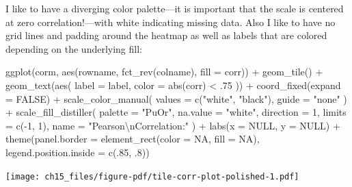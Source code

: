 \documentclass[
  letterpaper,
  DIV=11,
  numbers=noendperiod]{scrreprt}
\newenvironment{Shaded}{\begin{snugshade}}{\end{snugshade}}
\newcommand{\AttributeTok}[1]{\textcolor[rgb]{0.40,0.45,0.13}{#1}}
\newcommand{\ConstantTok}[1]{\textcolor[rgb]{0.56,0.35,0.01}{#1}}
\newcommand{\DecValTok}[1]{\textcolor[rgb]{0.68,0.00,0.00}{#1}}
\newcommand{\FunctionTok}[1]{\textcolor[rgb]{0.28,0.35,0.67}{#1}}
\newcommand{\NormalTok}[1]{\textcolor[rgb]{0.00,0.23,0.31}{#1}}
\newcommand{\SpecialCharTok}[1]{\textcolor[rgb]{0.37,0.37,0.37}{#1}}
\newcommand{\StringTok}[1]{\textcolor[rgb]{0.13,0.47,0.30}{#1}}
\begin{document}
I like to have a diverging color palette---it is important that the
scale is centered at zero correlation!---with white indicating missing
data. Also I like to have no grid lines and padding around the heatmap
as well as labels that are colored depending on the underlying fill:

\begin{Shaded}
\begin{Highlighting}[]
\FunctionTok{ggplot}\NormalTok{(corm, }\FunctionTok{aes}\NormalTok{(rowname, }\FunctionTok{fct\_rev}\NormalTok{(colname),}
                 \AttributeTok{fill =}\NormalTok{ corr)) }\SpecialCharTok{+}
  \FunctionTok{geom\_tile}\NormalTok{() }\SpecialCharTok{+}
  \FunctionTok{geom\_text}\NormalTok{(}\FunctionTok{aes}\NormalTok{(}
    \AttributeTok{label =}\NormalTok{ label,}
    \AttributeTok{color =} \FunctionTok{abs}\NormalTok{(corr) }\SpecialCharTok{\textless{}}\NormalTok{ .}\DecValTok{75}
\NormalTok{  )) }\SpecialCharTok{+}
  \FunctionTok{coord\_fixed}\NormalTok{(}\AttributeTok{expand =} \ConstantTok{FALSE}\NormalTok{) }\SpecialCharTok{+}
  \FunctionTok{scale\_color\_manual}\NormalTok{(}
    \AttributeTok{values =} \FunctionTok{c}\NormalTok{(}\StringTok{"white"}\NormalTok{, }\StringTok{"black"}\NormalTok{),}
    \AttributeTok{guide =} \StringTok{"none"}
\NormalTok{  ) }\SpecialCharTok{+}
  \FunctionTok{scale\_fill\_distiller}\NormalTok{(}
    \AttributeTok{palette =} \StringTok{"PuOr"}\NormalTok{, }\AttributeTok{na.value =} \StringTok{"white"}\NormalTok{,}
    \AttributeTok{direction =} \DecValTok{1}\NormalTok{, }\AttributeTok{limits =} \FunctionTok{c}\NormalTok{(}\SpecialCharTok{{-}}\DecValTok{1}\NormalTok{, }\DecValTok{1}\NormalTok{),}
    \AttributeTok{name =} \StringTok{"Pearson}\SpecialCharTok{\textbackslash{}n}\StringTok{Correlation:"}
\NormalTok{  ) }\SpecialCharTok{+}
  \FunctionTok{labs}\NormalTok{(}\AttributeTok{x =} \ConstantTok{NULL}\NormalTok{, }\AttributeTok{y =} \ConstantTok{NULL}\NormalTok{) }\SpecialCharTok{+}
  \FunctionTok{theme}\NormalTok{(}\AttributeTok{panel.border =} \FunctionTok{element\_rect}\NormalTok{(}\AttributeTok{color =} \ConstantTok{NA}\NormalTok{, }\AttributeTok{fill =} \ConstantTok{NA}\NormalTok{),}
        \AttributeTok{legend.position.inside =} \FunctionTok{c}\NormalTok{(.}\DecValTok{85}\NormalTok{, .}\DecValTok{8}\NormalTok{))}
\end{Highlighting}
\end{Shaded}

\texttt{[image: ch15\_files/figure-pdf/tile-corr-plot-polished-1.pdf]}
\end{document}
